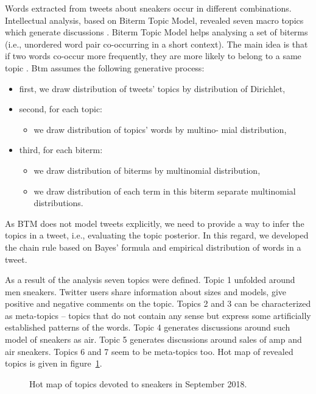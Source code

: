 Words extracted from tweets about sneakers occur in different combinations. Intellectual analysis, based on Biterm Topic Model, revealed seven macro topics which generate discussions \cite{BlekanovTarasovMaksimov}. Biterm Topic Model helps analysing a set of biterms (i.e., unordered word pair co-occurring in a short context). The main idea is that if two words co-occur more frequently, they are more likely to belong to a same topic \cite{YanyanJiafengXueqi}. Btm assumes the following generative process:
\begin{itemize}
	\item first, we draw distribution of tweets’ topics by distribution of Dirichlet,
	\item second, for each topic:
	\begin{itemize}
		\item we draw distribution of topics’ words by multino- mial distribution,
	\end{itemize}
	\item third, for each biterm:
	\begin{itemize}
		\item we draw distribution of biterms by multinomial
		distribution,
		\item we draw distribution of each term in this biterm separate multinomial distributions.
	\end{itemize}
\end{itemize}

As BTM does not model tweets explicitly, we need to provide a way to infer the topics in a tweet, i.e., evaluating the topic posterior. In this regard, we developed the chain rule based on Bayes’ formula and empirical distribution of words in a tweet.

As a result of the analysis seven topics were defined. Topic 1 unfolded around men sneakers. Twitter users share information about sizes and models, give positive and negative comments on the topic. Topics 2 and 3 can be characterized as meta-topics -- topics that do not contain any sense but express some artificially established patterns of the words. Topic 4 generates discussions around such model of sneakers as air. Topic 5 generates discussions around sales of amp and air sneakers. Topics 6 and 7 seem to be meta-topics too. Hot map of revealed topics is given in figure~\cref{fig:topicHotMap}.

\begin{figure}[ht]
	\caption{Hot map of topics devoted to sneakers in September 2018.}\label{fig:topicHotMap}
\end{figure}

